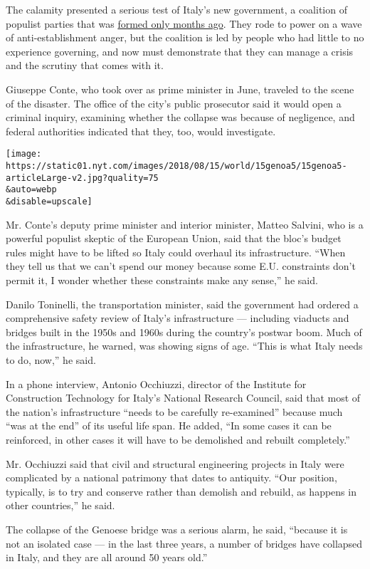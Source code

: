 The calamity presented a serious test of Italy's new government, a
coalition of populist parties that was
\href{https://www.nytimes.com/2018/05/23/world/europe/italy-european-union.html}{formed
only months ago}. They rode to power on a wave of anti-establishment
anger, but the coalition is led by people who had little to no
experience governing, and now must demonstrate that they can manage a
crisis and the scrutiny that comes with it.

Giuseppe Conte, who took over as prime minister in June, traveled to the
scene of the disaster. The office of the city's public prosecutor said
it would open a criminal inquiry, examining whether the collapse was
because of negligence, and federal authorities indicated that they, too,
would investigate.

\texttt{[image: https://static01.nyt.com/images/2018/08/15/world/15genoa5/15genoa5-articleLarge-v2.jpg?quality=75\\\&auto=webp\\\&disable=upscale]}

Mr. Conte's deputy prime minister and interior minister, Matteo Salvini,
who is a powerful populist skeptic of the European Union, said that the
bloc's budget rules might have to be lifted so Italy could overhaul its
infrastructure. ``When they tell us that we can't spend our money
because some E.U. constraints don't permit it, I wonder whether these
constraints make any sense,'' he said.

Danilo Toninelli, the transportation minister, said the government had
ordered a comprehensive safety review of Italy's infrastructure ---
including viaducts and bridges built in the 1950s and 1960s during the
country's postwar boom. Much of the infrastructure, he warned, was
showing signs of age. ``This is what Italy needs to do, now,'' he said.

In a phone interview, Antonio Occhiuzzi, director of the Institute for
Construction Technology for Italy's National Research Council, said that
most of the nation's infrastructure ``needs to be carefully
re-examined'' because much ``was at the end'' of its useful life span.
He added, ``In some cases it can be reinforced, in other cases it will
have to be demolished and rebuilt completely.''

Mr. Occhiuzzi said that civil and structural engineering projects in
Italy were complicated by a national patrimony that dates to antiquity.
``Our position, typically, is to try and conserve rather than demolish
and rebuild, as happens in other countries,'' he said.

The collapse of the Genoese bridge was a serious alarm, he said,
``because it is not an isolated case --- in the last three years, a
number of bridges have collapsed in Italy, and they are all around 50
years old.''

